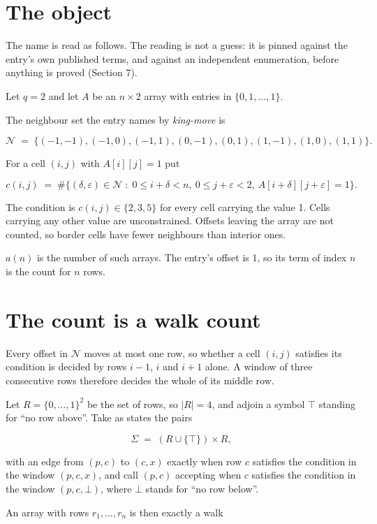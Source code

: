 \documentclass[11pt]{article}
\theoremstyle{definition}
\begin{document}
\section{The object}

The name is read as follows. The reading is not a guess: it is pinned against the entry's own published terms, and against an independent enumeration, before anything is proved (Section 7).

Let $q = 2$ and let $A$ be an $n \times 2$ array with entries in $\{0,1,\dots,1\}$.

The neighbour set the entry names by {\itshape king-move} is

\[\mathcal{N} \;=\; \{(-1,-1), (-1,0), (-1,1), (0,-1), (0,1), (1,-1), (1,0), (1,1)\}.\]

For a cell $(i,j)$ with $A[i][j] = 1$ put

\[c(i,j) \;=\; \#\bigl\{(\delta,\varepsilon)\in\mathcal{N} \;:\; 0\le i+\delta<n,\ 0\le j+\varepsilon<2,\ A[i+\delta][j+\varepsilon] = 1\bigr\}.\]

The condition is $c(i,j) \in \{2, 3, 5\}$ for every cell carrying the value 1. Cells carrying any other value are unconstrained. Offsets leaving the array are not counted, so border cells have fewer neighbours than interior ones.

$a(n)$ is the number of such arrays. The entry's offset is 1, so its term of index $n$ is the count for $n$ rows.

\section{The count is a walk count}

Every offset in $\mathcal{N}$ moves at most one row, so whether a cell $(i,j)$ satisfies its condition is decided by rows $i-1$, $i$ and $i+1$ alone. A window of three consecutive rows therefore decides the whole of its middle row.

Let $R = \{0,\dots,1\}^{2}$ be the set of rows, so $|R| = 4$, and adjoin a symbol $\top$ standing for ``no row above''. Take as states the pairs

\[\Sigma \;=\; (R \cup \{\top\}) \times R,\]

with an edge from $(p,c)$ to $(c,x)$ exactly when row $c$ satisfies the condition in the window $(p,c,x)$, and call $(p,c)$ accepting when $c$ satisfies the condition in the window $(p,c,\bot)$, where $\bot$ stands for ``no row below''.

An array with rows $r_1,\dots,r_n$ is then exactly a walk
\end{document}
